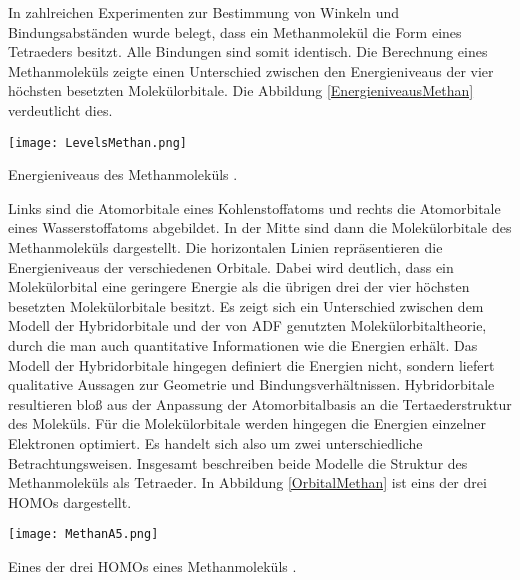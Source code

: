 In zahlreichen Experimenten zur Bestimmung von Winkeln und Bindungsabständen wurde belegt, dass ein Methanmolekül die Form eines Tetraeders besitzt. Alle Bindungen sind somit identisch.
Die Berechnung eines Methanmoleküls zeigte einen Unterschied zwischen den Energieniveaus der vier höchsten besetzten Molekülorbitale. Die Abbildung \ref{EnergieniveausMethan} verdeutlicht dies.

\begin{dsafigure}
 \centering
 \texttt{[image: LevelsMethan.png]}
 \caption{Energieniveaus des Methanmoleküls \cite{ADF2017authors}.}
 \label{EnergieniveausMethan}
\end{dsafigure}

Links sind die Atomorbitale eines Kohlenstoffatoms und rechts die Atomorbitale eines Wasserstoffatoms abgebildet. In der Mitte sind dann die Molekülorbitale des Methanmoleküls dargestellt. Die horizontalen Linien repräsentieren die Energieniveaus der verschiedenen Orbitale. Dabei wird deutlich, dass ein Molekülorbital eine geringere Energie als die übrigen drei der vier höchsten besetzten Molekülorbitale besitzt. 
Es zeigt sich ein Unterschied zwischen dem Modell der Hybridorbitale und der von ADF genutzten Molekülorbitaltheorie, durch die man auch quantitative Informationen wie die Energien erhält. Das Modell der Hybridorbitale hingegen definiert die Energien nicht, sondern liefert qualitative Aussagen zur Geometrie und Bindungsverhältnissen. Hybridorbitale resultieren bloß aus der Anpassung der Atomorbitalbasis an die Tertaederstruktur des Moleküls. Für die Molekülorbitale werden hingegen die Energien einzelner Elektronen optimiert. 
Es handelt sich also um zwei unterschiedliche Betrachtungsweisen.
Insgesamt beschreiben beide Modelle die Struktur des Methanmoleküls als Tetraeder. In Abbildung \ref{OrbitalMethan} ist eins der drei HOMOs dargestellt.

\begin{dsafigure}
 \centering
 \texttt{[image: MethanA5.png]}
 \caption{Eines der drei HOMOs eines Methanmoleküls \cite{ADF2017authors}.}
 \label{OrbitalMethan}
\end{dsafigure}
